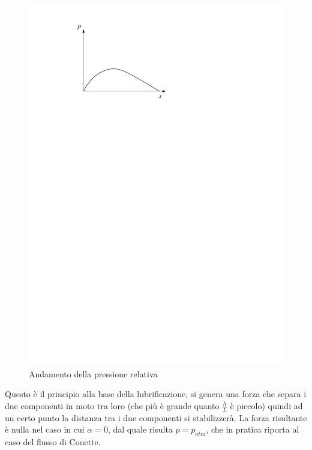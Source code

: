 	\begin{figure}[ht]
		\includegraphics[scale=0.7]{./6.3 Teoria della lubrificazione/6.3-2}
		\centering
		\caption{Andamento della pressione relativa}
	\end{figure}
%
Questo è il principio alla base della lubrificazione, si genera una forza che separa i due componenti in moto tra loro (che più è grande quanto $\frac{h}{L}$ è piccolo) quindi ad un certo punto la distanza tra i due componenti si stabilizzerà.
La forza risultante è nulla nel caso in cui $\alpha = 0$, dal quale risulta $p = p_{atm}$, che in pratica riporta al caso del flusso di Couette.

